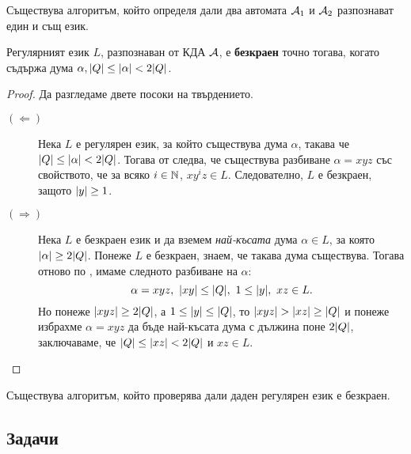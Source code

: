 \begin{cor}
  Съществува алгоритъм, който определя дали два автомата $\mathcal{A}_1$ и $\mathcal{A}_2$ разпознават един и същ език.
\end{cor}

\begin{prop}
  Регулярният език $L$, 
  разпознаван от КДА $\mathcal{A}$, е {\bf безкраен} точно тогава, когато съдържа дума $\alpha, \lvert{Q}\rvert \leq \lvert{\alpha}\rvert < 2\lvert{Q}\rvert$.
\end{prop}
\begin{proof}
  Да разгледаме двете посоки на твърдението.
  \begin{description}
  \item[$(\Leftarrow)$]
    Нека $L$ е регулярен език, за който съществува дума $\alpha$, такава че $\lvert{Q}\rvert \leq \lvert{\alpha}\rvert < 2\lvert{Q}\rvert$.
    Тогава от  следва, че съществува разбиване $\alpha = xyz$ със свойството, че
    за всяко $i \in \mathbb{N}$, $xy^iz \in L$. Следователно, $L$ е безкраен, защото $\lvert{y}\rvert \geq 1$.
  \item[$(\Rightarrow)$]
    Нека $L$ е безкраен език и %
    да вземем {\em най-късата} дума $\alpha \in L$, за която $\lvert{\alpha}\rvert \geq 2\lvert{Q}\rvert$.
    Понеже $L$ е безкраен, знаем, че такава дума съществува.
    Тогава отново по , имаме следното разбиване на $\alpha$:
    \[\alpha = xyz,\ \abs{xy} \leq \abs{Q},\ 1\leq \abs{y},\ xz \in L.\]
    Но понеже $\lvert{xyz}\rvert \geq 2\lvert{Q}\rvert$, а $1 \leq \lvert{y}\rvert \leq \lvert{Q}\rvert$, то $\lvert{xyz}\rvert > \lvert{xz}\rvert \geq \lvert{Q}\rvert$ и понеже избрахме $\alpha = xyz$
    да бъде най-късата дума с дължина поне $2\lvert{Q}\rvert$, заключаваме, че $\lvert{Q}\rvert \leq \lvert{xz}\rvert < 2\lvert{Q}\rvert$ и $xz \in L$.
  \end{description}
\end{proof}

\begin{cor}
  Съществува алгоритъм, който проверява дали даден регулярен език е безкраен.
\end{cor}

\subsection{Задачи}

